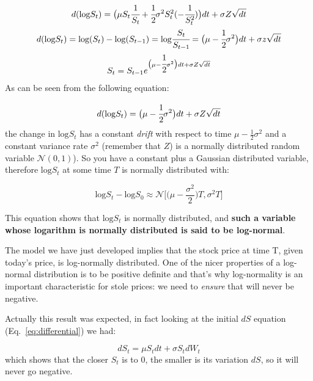 \begin{equation}
\begin{gathered}
d(\textrm{log} S_t) = \big(\mu S_t \cfrac{1}{S_t} + \cfrac{1}{2}\sigma^2 S_t^2 (-\cfrac{1}{S_t^2})\big)dt + \sigma Z\sqrt{dt}\\
d(\textrm{log} S_t) = \textrm{log} (S_t) - \textrm{log} (S_{t-1}) = \textrm{log} \cfrac{S_t}{S_{t-1}} = \big(\mu - \cfrac{1}{2}\sigma^2\big)dt + \sigma z\sqrt{dt}\\
S_t = S_{t-1}e^{\big(\mu - \cfrac{1}{2}\sigma^2\big)dt + \sigma Z\sqrt{dt}}
\end{gathered}
\label{eq:gbm_solution}
\end{equation}
As can be seen from the following equation:

\begin{equation}
d(\textrm{log} S_t) = \big(\mu - \cfrac{1}{2}\sigma^2\big)dt + \sigma Z\sqrt{dt}
\end{equation}
the change in \(\textrm{log} S_t\) has a constant \emph{drift} with respect to time \(\mu - \frac{1}{2}\sigma^2\) and a constant variance rate \(\sigma^2\) (remember that $Z$) is a normally distributed random variable \(\mathcal{N}(0,1)\)). So you have a constant plus a Gaussian
distributed variable, therefore \(\textrm{log} S_t\) at some time \(T\) is normally distributed with:

\begin{equation}
\textrm{log}S_t - \textrm{log}S_0 \approx\mathcal{N}\big[\big(\mu-\frac{\sigma^2}{2}\big)T, \sigma^2 T\big]
\end{equation}

This equation shows that \(\textrm{log}S_t\) is normally distributed, and \textbf{such a variable whose logarithm is normally distributed is said to be log-normal}. 

The model we have just developed implies that the stock price at time T, given today's price, is log-normally distributed. One of the nicer properties of a log-normal distribution is to be positive definite and that's why log-normality is an important characteristic for stole prices: we need to \emph{ensure} that will never be negative. 

Actually this result was expected, in fact looking at the initial \(dS\) equation (Eq.~\ref{eq:differential}) we had:

\begin{equation}
dS_t = \mu S_tdt + \sigma S_t dW_t
\end{equation}
which shows that the closer \(S_t\) is to 0, the smaller is its variation \(dS\), so it will never go negative.

